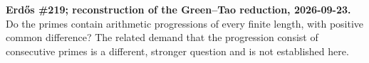 \textbf{Erd\H{o}s \#219; reconstruction of the Green--Tao reduction, 2026-09-23.}
Do the primes contain arithmetic progressions of every finite length, with positive common difference? The related demand that the progression consist of consecutive primes is a different, stronger question and is not established here.
